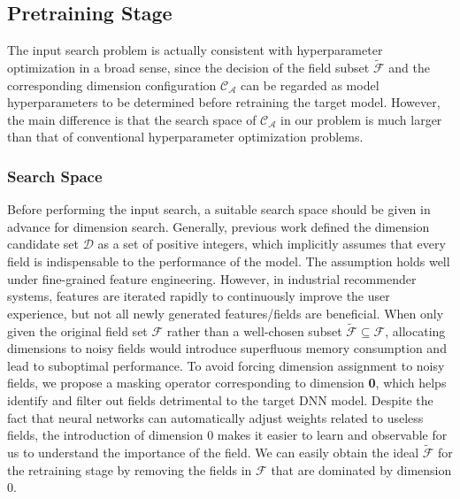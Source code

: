 \documentclass[10pt,journal,compsoc]{IEEEtran}
\begin{document}
\subsection{Pretraining Stage}
The input search problem is actually consistent with hyperparameter optimization \cite{franceschi2018bilevel} in a broad sense, since the decision of the field subset $\widetilde{\mathcal{F}}$ and the corresponding dimension configuration $\mathcal{C}_\mathcal{A}$ can be regarded as model hyperparameters to be determined before retraining the target model. 
However, the main difference is that the search space of $\mathcal{C}_\mathcal{A}$ in our problem is much larger than that of conventional hyperparameter optimization problems.

\subsubsection{Search Space}
\label{sec:Search space}
Before performing the input search, a suitable search space should be given in advance for dimension search.
Generally, previous work \cite{zhao2020memory,cheng2020differentiable} defined the dimension candidate set $\mathcal{D}$ as a set of positive integers, which implicitly assumes that every field is indispensable to the performance of the model. The assumption holds well under fine-grained feature engineering. However, in industrial recommender systems, features are iterated rapidly to continuously improve the user experience, 
{but not all newly generated features/fields are beneficial.} 
{When only given the original field set $\mathcal{F}$ rather than a well-chosen subset $\widetilde{\mathcal{F}}\subseteq \mathcal{F}$, allocating dimensions to noisy fields would introduce superfluous memory consumption and lead to suboptimal performance. To avoid forcing dimension assignment to noisy fields, we propose a masking operator corresponding to dimension \textbf{0}, which helps identify and filter out fields detrimental to the target DNN model.} 
Despite the fact that neural networks can automatically adjust weights related to useless fields, the introduction of dimension {0} makes it easier to learn and observable for us to understand the importance of the field. 
{We can easily obtain the ideal $\widetilde{\mathcal{F}}$ for the retraining stage by removing the fields in $\mathcal{F}$ that are dominated by dimension {0}.}
\end{document}
